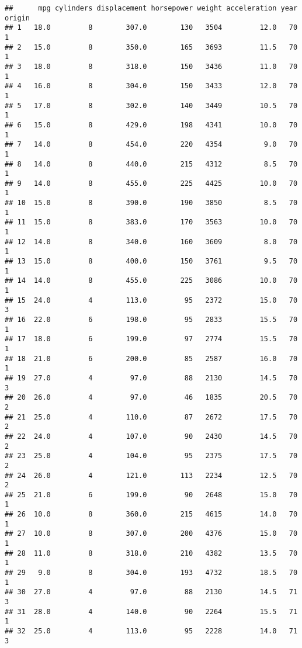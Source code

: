 \documentclass[
]{article}
\begin{document}
\begin{verbatim}
##      mpg cylinders displacement horsepower weight acceleration year origin
## 1   18.0         8        307.0        130   3504         12.0   70      1
## 2   15.0         8        350.0        165   3693         11.5   70      1
## 3   18.0         8        318.0        150   3436         11.0   70      1
## 4   16.0         8        304.0        150   3433         12.0   70      1
## 5   17.0         8        302.0        140   3449         10.5   70      1
## 6   15.0         8        429.0        198   4341         10.0   70      1
## 7   14.0         8        454.0        220   4354          9.0   70      1
## 8   14.0         8        440.0        215   4312          8.5   70      1
## 9   14.0         8        455.0        225   4425         10.0   70      1
## 10  15.0         8        390.0        190   3850          8.5   70      1
## 11  15.0         8        383.0        170   3563         10.0   70      1
## 12  14.0         8        340.0        160   3609          8.0   70      1
## 13  15.0         8        400.0        150   3761          9.5   70      1
## 14  14.0         8        455.0        225   3086         10.0   70      1
## 15  24.0         4        113.0         95   2372         15.0   70      3
## 16  22.0         6        198.0         95   2833         15.5   70      1
## 17  18.0         6        199.0         97   2774         15.5   70      1
## 18  21.0         6        200.0         85   2587         16.0   70      1
## 19  27.0         4         97.0         88   2130         14.5   70      3
## 20  26.0         4         97.0         46   1835         20.5   70      2
## 21  25.0         4        110.0         87   2672         17.5   70      2
## 22  24.0         4        107.0         90   2430         14.5   70      2
## 23  25.0         4        104.0         95   2375         17.5   70      2
## 24  26.0         4        121.0        113   2234         12.5   70      2
## 25  21.0         6        199.0         90   2648         15.0   70      1
## 26  10.0         8        360.0        215   4615         14.0   70      1
## 27  10.0         8        307.0        200   4376         15.0   70      1
## 28  11.0         8        318.0        210   4382         13.5   70      1
## 29   9.0         8        304.0        193   4732         18.5   70      1
## 30  27.0         4         97.0         88   2130         14.5   71      3
## 31  28.0         4        140.0         90   2264         15.5   71      1
## 32  25.0         4        113.0         95   2228         14.0   71      3

\end{verbatim}
\end{document}
